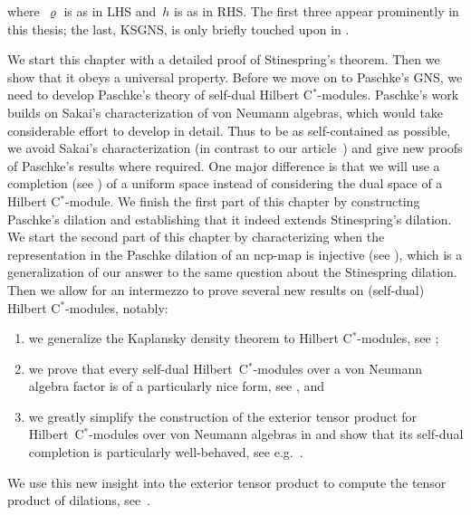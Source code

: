 \begin{parsec}
\begin{point}
\begin{center}
{        where~$\varrho$ is as in LHS
        and~$h$ is as in RHS.
    The first three appear prominently in this thesis;
        the last, KSGNS, is only briefly touched upon in .}
\end{center}
\begin{point}%
We start this chapter with a detailed proof of Stinespring's theorem.
Then we show that it obeys a universal property.
Before we move on to Paschke's GNS,
    we need to develop Paschke's theory of self-dual Hilbert C$^*$-modules.
Paschke's work builds on Sakai's characterization of von Neumann algebras,
    which would take considerable effort to develop in detail.
Thus to be as self-contained as possible,
    we avoid Sakai's characterization (in contrast to our
        article~\cite{wwpaschke})
    and give new proofs
    of Paschke's results where required.
One major difference is that we will use
    a completion (see ) of a uniform space
    instead of considering the dual space of a Hilbert C$^*$-module.
We finish the first part of this chapter
    by constructing Paschke's dilation
    and establishing that it indeed extends Stinespring's dilation.
We start the second part of this chapter
    by characterizing when the representation in the Paschke dilation
    of an ncp-map is injective (see ),
    which is a generalization of our answer \cite{stineinj}
    to the same question about the Stinespring dilation.
Then we allow for an intermezzo
    to prove several new results on (self-dual) Hilbert C$^*$-modules,
    notably:
\begin{enumerate}
    \item
    we generalize the Kaplansky density theorem
    to Hilbert C$^*$-modules, see ;
    \item
   we prove that every self-dual Hilbert~C$^*$-modules over
            a von Neumann algebra factor
            is of a particularly nice form,
            see , and
    \item
    we greatly simplify the construction of the exterior tensor product
        for Hilbert~C$^*$-modules over von Neumann algebras
        in 
        and show that its self-dual completion
        is particularly well-behaved, see e.g.~.
\end{enumerate}
We use this new insight into the exterior tensor product
    to compute the tensor product
    of dilations, see~.

\end{point}
\end{point}
\end{parsec}
